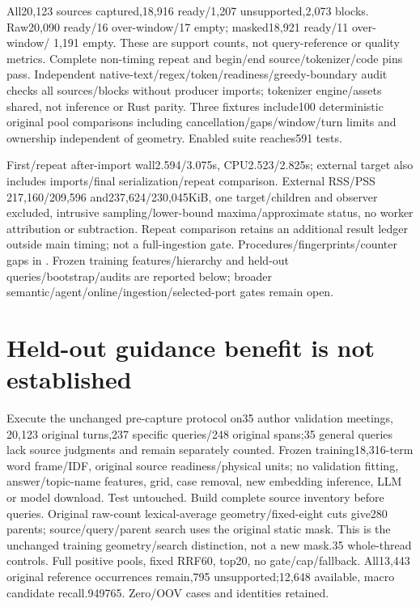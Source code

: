 \documentclass[11pt]{article}
\begin{document}
All20,123 sources captured,18,916 ready/1,207 unsupported,2,073 blocks.
Raw20,090 ready/16 over-window/17 empty; masked18,921 ready/11 over-window/
1,191 empty. These are support counts, not query-reference or quality metrics.
Complete non-timing repeat and begin/end source/tokenizer/code pins pass.
Independent native-text/regex/token/readiness/greedy-boundary audit checks
all sources/blocks without producer imports; tokenizer engine/assets shared,
not inference or Rust parity. Three fixtures include100 deterministic original
pool comparisons including cancellation/gaps/window/turn limits and ownership
independent of geometry. Enabled suite reaches591 tests.

First/repeat after-import wall2.594/3.075s, CPU2.523/2.825s; external target
also includes imports/final serialization/repeat comparison. External RSS/PSS
217,160/209,596 and237,624/230,045KiB, one target/children and observer excluded,
intrusive sampling/lower-bound maxima/approximate status, no worker attribution
or subtraction. Repeat comparison retains an additional result ledger outside
main timing; not a full-ingestion gate. Procedures/fingerprints/counter gaps in
. Frozen training
features/hierarchy and held-out queries/bootstrap/audits are reported below;
broader semantic/agent/online/ingestion/selected-port gates remain open.

\section{Held-out guidance benefit is not established}
Execute the unchanged pre-capture protocol on35 author validation meetings,
20,123 original turns,237 specific queries/248 original spans;35 general queries
lack source judgments and remain separately counted. Frozen training18,316-term
word frame/IDF, original source readiness/physical units; no validation fitting,
answer/topic-name features, grid, case removal, new embedding inference, LLM or
model download. Test untouched. Build complete source inventory before queries.
Original raw-count lexical-average geometry/fixed-eight cuts give280 parents;
source/query/parent search uses the original static mask. This is the unchanged
training geometry/search distinction, not a new mask.35 whole-thread controls.
Full positive pools, fixed RRF60, top20, no gate/cap/fallback. All13,443 original
reference occurrences remain,795 unsupported;12,648 available, macro candidate
recall.949765. Zero/OOV cases and identities retained.
\end{document}
